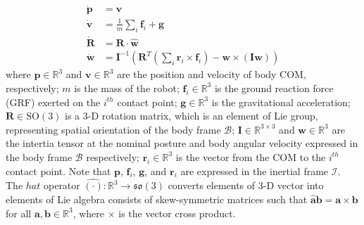 \begin{subequations} \label{eq:SRB}
	\begin{align}
	\label{eq:SRB1}
	\dot{\mathbf{p}} &= \mathbf{v} \\
	\label{eq:SRB2}
	\dot{\mathbf{v}} &= \frac{1}{m} \sum_{i} \mathbf{f}_{i} + \mathbf{g} \\
	\label{eq:SRB3}
	\dot{\mathbf{R}} &= \mathbf{R} \cdot \widehat{\mathbf{w}} \\
	\label{eq:SRB4}
	\dot{\mathbf{w}} &= \mathbf{I}^{-1} \left(\mathbf{R}^{T} (\sum_{i} \mathbf{r}_i \times \mathbf{f}_{i}) - \mathbf{w} \times (\mathbf{I} \mathbf{w})\right)
	\end{align}
\end{subequations}
where $\mathbf{p} \in \mathbb{R}^{3}$ and $\mathbf{v} \in \mathbb{R}^{3}$ are the position and velocity of body COM, respectively; ${m}$ is the mass of the robot; $\mathbf{f}_i \in \mathbb{R}^{3}$ is the ground reaction force (GRF) exerted on the $i^{th}$ contact point; $\mathbf{g} \in \mathbb{R}^{3}$ is the gravitational acceleration; $\mathbf{R} \in \mathrm{SO}(3)$ is a 3-D rotation matrix, which is an element of Lie group, representing spatial orientation of the body frame $\mathcal{B}$; $\mathbf{I} \in \mathbb{R}^{3\times3}$ and $\mathbf{w}\in \mathbb{R}^{3}$ are the intertia tensor at the nominal posture and body angular velocity expressed in the body frame $\mathcal{B}$ respectively; $\mathbf{r}_{i} \in \mathbb{R}^{3}$ is the vector from the COM to the $i^{th}$ contact point. Note that $\mathbf{p}$, $\mathbf{f}_{i}$, $\mathbf{g}$, and $\mathbf{r}_{i}$ are expressed in the inertial frame $\mathcal{I}$.
The $\mathit{hat}$ operator $\hat{(\cdot)} : \mathbb{R}^{3} \rightarrow \mathfrak{so}(3)$ converts elements of 3-D vector into elements of Lie algebra consists of skew-symmetric matrices such that $\widehat{\mathbf{a}} \mathbf{b}=\mathbf{a} \times \mathbf{b}$ for all $\mathbf{a},\mathbf{b} \in \mathbb{R}^{3}$, where ${\times}$ is the vector cross product.

